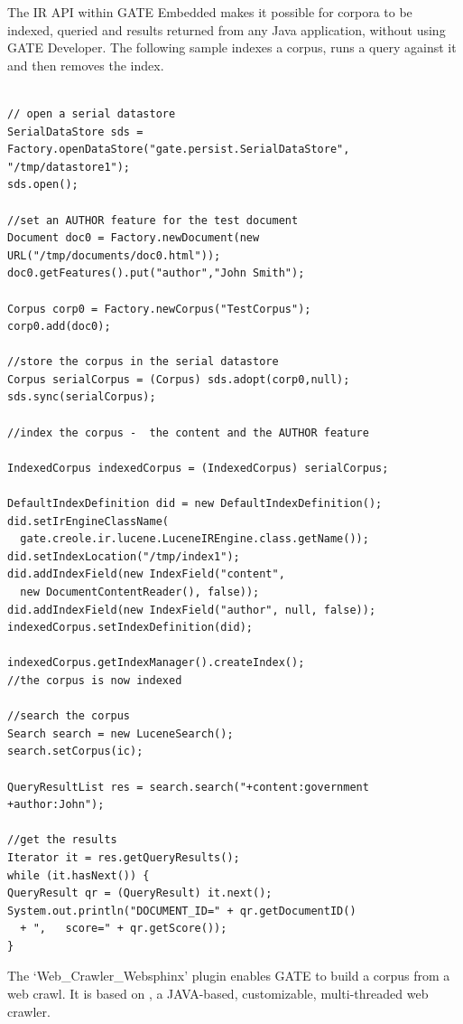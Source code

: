 The IR API within GATE Embedded makes it possible for corpora to be
indexed, queried and results returned from any Java application,
without using GATE Developer. The following sample indexes a corpus,
runs a query against it and then removes the index.

\begin{lstlisting}

// open a serial datastore
SerialDataStore sds =
Factory.openDataStore("gate.persist.SerialDataStore",
"/tmp/datastore1");
sds.open();

//set an AUTHOR feature for the test document
Document doc0 = Factory.newDocument(new URL("/tmp/documents/doc0.html"));
doc0.getFeatures().put("author","John Smith");

Corpus corp0 = Factory.newCorpus("TestCorpus");
corp0.add(doc0);

//store the corpus in the serial datastore
Corpus serialCorpus = (Corpus) sds.adopt(corp0,null);
sds.sync(serialCorpus);

//index the corpus -  the content and the AUTHOR feature

IndexedCorpus indexedCorpus = (IndexedCorpus) serialCorpus;

DefaultIndexDefinition did = new DefaultIndexDefinition();
did.setIrEngineClassName(
  gate.creole.ir.lucene.LuceneIREngine.class.getName());
did.setIndexLocation("/tmp/index1");
did.addIndexField(new IndexField("content",
  new DocumentContentReader(), false));
did.addIndexField(new IndexField("author", null, false));
indexedCorpus.setIndexDefinition(did);

indexedCorpus.getIndexManager().createIndex();
//the corpus is now indexed

//search the corpus
Search search = new LuceneSearch();
search.setCorpus(ic);

QueryResultList res = search.search("+content:government +author:John");

//get the results
Iterator it = res.getQueryResults();
while (it.hasNext()) {
QueryResult qr = (QueryResult) it.next();
System.out.println("DOCUMENT_ID=" + qr.getDocumentID()
  + ",   score=" + qr.getScore());
}

\end{lstlisting}

The `Web\_Crawler\_Websphinx' plugin enables GATE to build a corpus from a web
crawl.  It is based on
, a JAVA-based,
customizable, multi-threaded web crawler.


